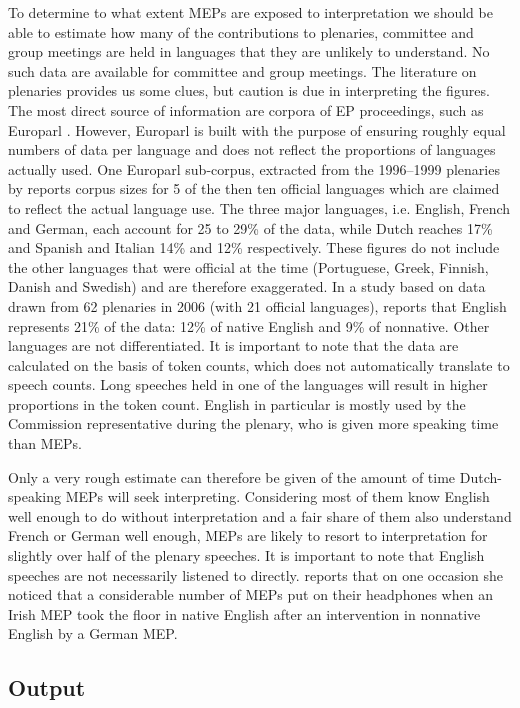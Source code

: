 \documentclass[output=paper]{langscibook}
\begin{document}
To determine to what extent MEPs are exposed to interpretation we should be able to estimate how many of the contributions to plenaries, committee and group meetings are held in languages that they are unlikely to understand. No such data are available for committee and group meetings. The literature on plenaries provides us some clues, but caution is due in interpreting the figures. The most direct source of information are corpora of EP proceedings, such as Europarl \citep{Koehn2005}. However, Europarl is built with the purpose of ensuring roughly equal numbers of data per language and does not reflect the proportions of languages actually used. One Europarl sub-corpus, extracted from the 1996--1999 plenaries by \citet{CartoniEtAl2013} reports corpus sizes for 5 of the then ten official languages which are claimed to reflect the actual language use. The three major languages, i.e. English, French and German, each account for 25 to 29\% of the data, while Dutch reaches 17\% and Spanish and Italian 14\% and 12\% respectively. These figures do not include the other languages that were official at the time (Portuguese, Greek, Finnish, Danish and Swedish) and are therefore exaggerated. In a study based on data drawn from 62 plenaries in 2006 (with 21 official languages), \citet{Cucchi2007} reports that English represents 21\% of the data: 12\% of native English and 9\% of nonnative. Other languages are not differentiated. It is important to note that the data are calculated on the basis of token counts, which does not automatically translate to speech counts. Long speeches held in one of the languages will result in higher proportions in the token count. English in particular is mostly used by the Commission representative during the plenary, who is given more speaking time than MEPs.

Only a very rough estimate can therefore be given of the amount of time Dutch-speaking MEPs will seek interpreting. Considering most of them know English well enough to do without interpretation and a fair share of them also understand French or German well enough, MEPs are likely to resort to interpretation for slightly over half of the plenary speeches. It is important to note that English speeches are not necessarily listened to directly. \citet{Wright2007} reports that on one occasion she noticed that a considerable number of MEPs put on their headphones when an Irish MEP took the floor in native English after an intervention in nonnative English by a German MEP. 

\subsection{Output}\label{sec:defrancq:3.3}
\end{document}
